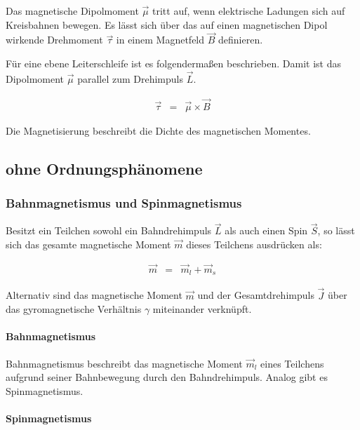 \documentclass[12pt,a4paper]{scrartcl}
\numberwithin{equation}{section} %
\begin{document}
Das magnetische Dipolmoment $\vec \mu$ tritt auf, wenn elektrische
Ladungen sich auf Kreisbahnen bewegen. Es lässt sich über das auf einen
magnetischen Dipol wirkende Drehmoment $\vec \tau$ in einem Magnetfeld
$\vec B$ definieren.

Für eine ebene Leiterschleife ist es folgendermaßen beschrieben. Damit
ist das Dipolmoment $\vec \mu$ parallel zum Drehimpuls $\vec{L}$.

\begin{eqnarray}
    \vec \tau &=& \vec \mu \times \vec B
\end{eqnarray}

Die Magnetisierung beschreibt die Dichte des magnetischen Momentes.

\hypertarget{ohne-ordnungsphuxe4nomene}{%
\subsection{ohne Ordnungsphänomene}\label{ohne-ordnungsphuxe4nomene}}

\hypertarget{bahnmagnetismus-und-spinmagnetismus}{%
\subsubsection{Bahnmagnetismus und
Spinmagnetismus}\label{bahnmagnetismus-und-spinmagnetismus}}

Besitzt ein Teilchen sowohl ein Bahndrehimpuls $\vec L$ als auch einen
Spin $\vec S$, so lässt sich das gesamte magnetische Moment
$\vec{m}$ dieses Teilchens ausdrücken als:

\begin{eqnarray}
    \vec m &=& \vec m_l + \vec m_s
\end{eqnarray}

Alternativ sind das magnetische Moment $\vec{m}$ und der
Gesamtdrehimpuls $\vec{J}$ über das gyromagnetische Verhältnis
$\gamma$ miteinander verknüpft.

\hypertarget{bahnmagnetismus}{%
\paragraph{Bahnmagnetismus}\label{bahnmagnetismus}}

Bahnmagnetismus beschreibt das magnetische Moment $\vec m_l$ eines
Teilchens aufgrund seiner Bahnbewegung durch den Bahndrehimpuls. Analog
gibt es Spinmagnetismus.

\hypertarget{spinmagnetismus}{%
\paragraph{Spinmagnetismus}\label{spinmagnetismus}}
\end{document}
